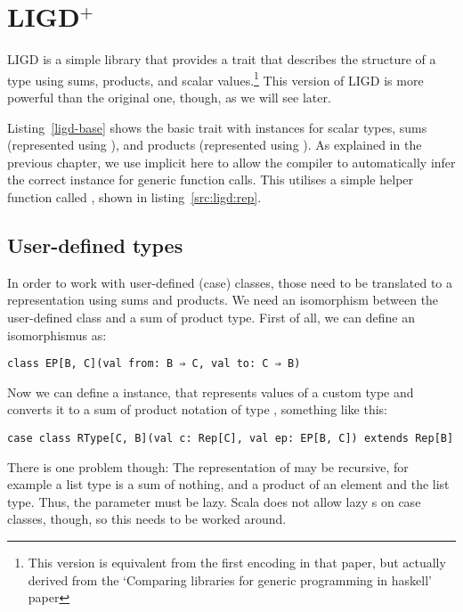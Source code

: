 \section{LIGD$^{+}$}


LIGD\cite{Cheney:2002:LIG:581690.581698} is a simple library that provides a  trait that describes
the structure of a type using sums, products, and scalar values.\footnote{This
version is equivalent from the first encoding in that paper, but actually
derived from the `Comparing libraries for generic programming in haskell'
paper\cite{DBLP:conf/haskell/RodriguezJJGKO08}}
This version of LIGD is more powerful than the original one, though, as we
will see later.

Listing~\ref{ligd-base} shows the basic  trait with instances for
scalar types, sums (represented using ), and products (represented
using ). As explained in the previous chapter, we use implicit
here to allow the compiler to automatically infer the correct 
instance for generic function calls. This  utilises a simple helper function called ,
shown in listing~\ref{src:ligd:rep}.


\subsection{User-defined types}
In order to work with user-defined (case) classes, those need to be
translated to a representation using sums and products. We need an
isomorphism between the user-defined class and a sum of product type. First
of all, we can define an isomorphismus as:
\begin{lstlisting}[gobble=2]
  class EP[B, C](val from: B ⇒ C, val to: C ⇒ B)
\end{lstlisting}
Now we can define a  instance, that represents values of a custom
type  and converts it to a sum of product notation of type ,
something like this:
\begin{lstlisting}[gobble=2]
  case class RType[C, B](val c: Rep[C], val ep: EP[B, C]) extends Rep[B]
\end{lstlisting}
There is one problem though: The representation of  may be recursive,
for example a list type is a sum of nothing, and a product of an element and
the list type. Thus, the parameter  must be lazy. Scala does not allow
lazy s on case classes, though, so this needs to be worked around.

